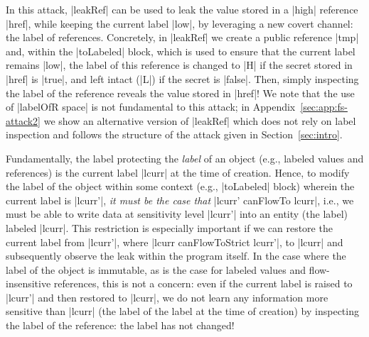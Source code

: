 %
In this attack, |leakRef| can be used to leak the value stored in a |high| reference
|href|, while keeping the current label |low|, by leveraging a new
covert channel: the label of references.
%
Concretely, in |leakRef| we create a public reference |tmp| and, within the
|toLabeled| block, which is used to ensure that the current label remains
|low|, the label of this reference is changed to |H| if the secret stored in
|href| is |true|, and left intact (|L|) if the secret is |false|.
%
Then, simply inspecting the label of the reference reveals the value stored in
|href|!
%
We note that the use of |labelOfR space| is not fundamental to this attack; in
Appendix~\ref{sec:app:fs-attack2} we show an alternative version of |leakRef|
which does not rely on label inspection and follows the structure of the attack
given in Section~\ref{sec:intro}.

Fundamentally, the label protecting the \emph{label} of an object (e.g.,
labeled values and references) is the current label |lcurr| at the time of
creation.
%
Hence, to modify the label of the object within some context (e.g., |toLabeled|
block) wherein the current label is |lcurr'|, \emph{it must be the case that} |lcurr'
canFlowTo lcurr|, i.e., we must be able to write data at sensitivity level
|lcurr'| into an entity (the label) labeled |lcurr|.
%
This restriction is especially important if we can restore the current label
from |lcurr'|, where |lcurr canFlowToStrict lcurr'|,  
to |lcurr| and subsequently observe the leak within the program itself.
%
In the case where the label of the object is immutable, as is the case for
labeled values and flow-insensitive references, this is not a concern: even if
the current label is raised to |lcurr'| and then restored to |lcurr|, we do not
learn any information more sensitive than |lcurr| (the label of the label at the
time of creation) by inspecting the label of the reference: the label has not
changed!
%

